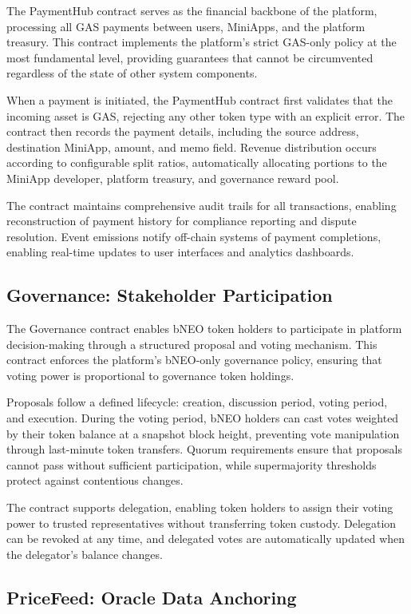 \documentclass[11pt,a4paper]{article}
\begin{document}
The PaymentHub contract serves as the financial backbone of the platform, processing all GAS payments between users, MiniApps, and the platform treasury. This contract implements the platform's strict GAS-only policy at the most fundamental level, providing guarantees that cannot be circumvented regardless of the state of other system components.

When a payment is initiated, the PaymentHub contract first validates that the incoming asset is GAS, rejecting any other token type with an explicit error. The contract then records the payment details, including the source address, destination MiniApp, amount, and memo field. Revenue distribution occurs according to configurable split ratios, automatically allocating portions to the MiniApp developer, platform treasury, and governance reward pool.

The contract maintains comprehensive audit trails for all transactions, enabling reconstruction of payment history for compliance reporting and dispute resolution. Event emissions notify off-chain systems of payment completions, enabling real-time updates to user interfaces and analytics dashboards.

\subsection{Governance: Stakeholder Participation}

The Governance contract enables bNEO token holders to participate in platform decision-making through a structured proposal and voting mechanism. This contract enforces the platform's bNEO-only governance policy, ensuring that voting power is proportional to governance token holdings.

Proposals follow a defined lifecycle: creation, discussion period, voting period, and execution. During the voting period, bNEO holders can cast votes weighted by their token balance at a snapshot block height, preventing vote manipulation through last-minute token transfers. Quorum requirements ensure that proposals cannot pass without sufficient participation, while supermajority thresholds protect against contentious changes.

The contract supports delegation, enabling token holders to assign their voting power to trusted representatives without transferring token custody. Delegation can be revoked at any time, and delegated votes are automatically updated when the delegator's balance changes.

\subsection{PriceFeed: Oracle Data Anchoring}
\end{document}
